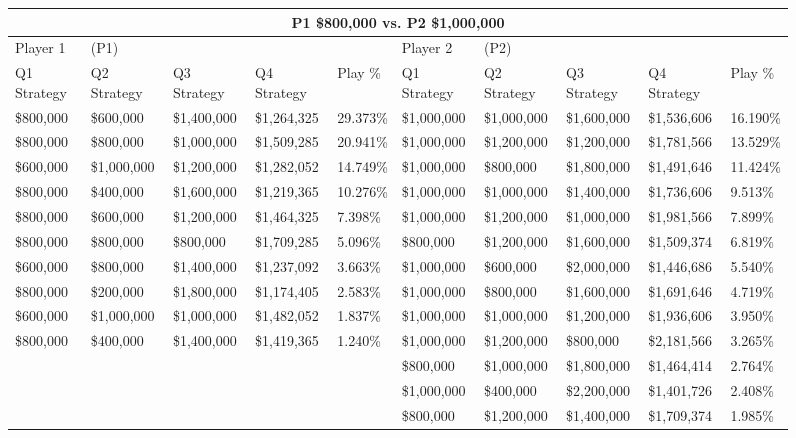 \documentclass[11pt]{article}
\begin{document}
\begin{figure}
\tiny
\begin{tabular}{ |p{1.0cm}p{1.0cm}p{1.0cm}p{2.0cm}|p{1.0cm}||p{1.0cm}p{1.0cm}p{1.0cm}p{2.0cm}|p{1.0cm}|}
\hline
\multicolumn{10}{|c|}{P1 \$800,000 vs. P2 \$1,000,000} \\
\hline
Player 1 & (P1) & & & & Player 2 & (P2) & & & \\
\hline
Q1 Strategy & Q2 Strategy & Q3 Strategy & Q4 Strategy  &  Play \% & Q1 Strategy & Q2 Strategy & Q3 Strategy & Q4 Strategy  &  Play \%\\
\hline
\$800,000 & \$600,000 & \$1,400,000 & \$1,264,325 & 29.373\% & \$1,000,000 & \$1,000,000 & \$1,600,000 & \$1,536,606 & 16.190\% \\
\$800,000 & \$800,000 & \$1,000,000 & \$1,509,285 & 20.941\% & \$1,000,000 & \$1,200,000 & \$1,200,000 & \$1,781,566 & 13.529\% \\
\$600,000 & \$1,000,000 & \$1,200,000 & \$1,282,052 & 14.749\% & \$1,000,000 & \$800,000 & \$1,800,000 & \$1,491,646 & 11.424\% \\
\$800,000 & \$400,000 & \$1,600,000 & \$1,219,365 & 10.276\% & \$1,000,000 & \$1,000,000 & \$1,400,000 & \$1,736,606 & 9.513\% \\
\$800,000 & \$600,000 & \$1,200,000 & \$1,464,325 & 7.398\% & \$1,000,000 & \$1,200,000 & \$1,000,000 & \$1,981,566 & 7.899\% \\
\$800,000 & \$800,000 & \$800,000 & \$1,709,285 & 5.096\% & \$800,000 & \$1,200,000 & \$1,600,000 & \$1,509,374 & 6.819\% \\
\$600,000 & \$800,000 & \$1,400,000 & \$1,237,092 & 3.663\% & \$1,000,000 & \$600,000 & \$2,000,000 & \$1,446,686 & 5.540\% \\
\$800,000 & \$200,000 & \$1,800,000 & \$1,174,405 & 2.583\% & \$1,000,000 & \$800,000 & \$1,600,000 & \$1,691,646 & 4.719\% \\
\$600,000 & \$1,000,000 & \$1,000,000 & \$1,482,052 & 1.837\% & \$1,000,000 & \$1,000,000 & \$1,200,000 & \$1,936,606 & 3.950\% \\
\$800,000 & \$400,000 & \$1,400,000 & \$1,419,365 & 1.240\% & \$1,000,000 & \$1,200,000 & \$800,000 & \$2,181,566 & 3.265\% \\
& & & & & \$800,000 & \$1,000,000 & \$1,800,000 & \$1,464,414 & 2.764\% \\
& & & & & \$1,000,000 & \$400,000 & \$2,200,000 & \$1,401,726 & 2.408\% \\
& & & & & \$800,000 & \$1,200,000 & \$1,400,000 & \$1,709,374 & 1.985\% \\

\end{tabular}
\end{figure}
\end{document}
